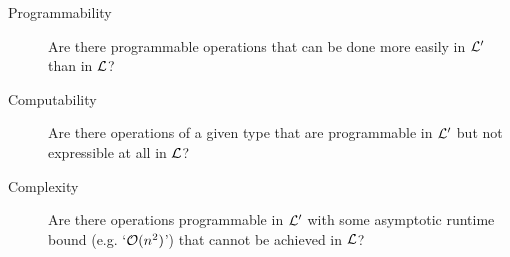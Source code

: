 \documentclass[12pt,phd,lfcs,twoside,openright,logo,leftchapter,normalheadings]{infthesis}
\theoremstyle{plain}
\theoremstyle{definition}
\begin{document}
%







%
\begin{description}
\item[Programmability] Are there programmable operations that can be
  done more easily in $\mathcal L'$ than in $\mathcal L$?
\item[Computability] Are there operations of a given type
  that are programmable in $\mathcal L'$ but not expressible at all in $\mathcal L$?
\item[Complexity] Are there operations programmable in $\mathcal L'$
  with some asymptotic runtime bound (e.g. `$\mathcal{O}(n^2)$') that cannot be
  achieved in $\mathcal L$?
\end{description}
%
\end{document}
